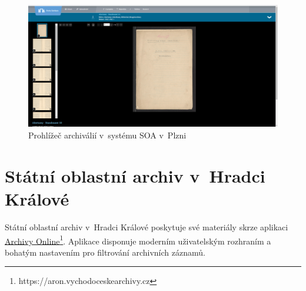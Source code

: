\begin{figure}[htbp]
\centering
    \includegraphics[scale=.2]{obrazky-figures/archives/soaPlzen/prohlizec.png}
    \caption{Prohlížeč archiválií v~systému SOA v~Plzni}
\end{figure}


\section{Státní oblastní archiv v~Hradci Králové}
Státní oblastní archiv v~Hradci Králové poskytuje své materiály skrze aplikaci \href{https://aron.vychodoceskearchivy.cz}{Archivy Online}\footnote{https://aron.vychodoceskearchivy.cz}. Aplikace disponuje moderním uživatelským rozhraním a bohatým nastavením pro filtrování archivních záznamů.

